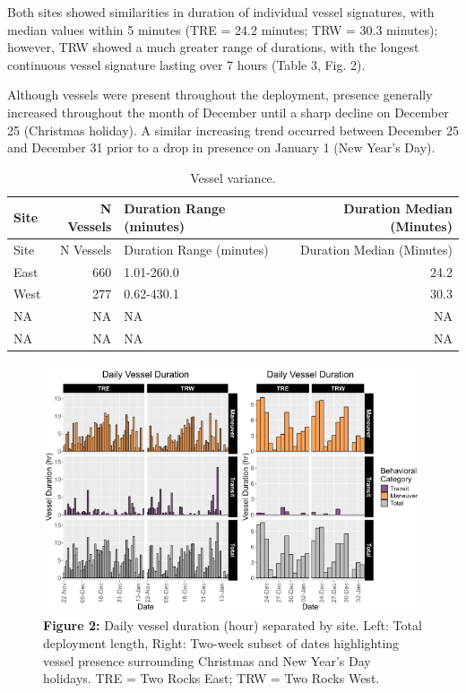 \documentclass[
  letterpaper,
  oneside,
  open=any]{scrbook}
\begin{document}
Both sites showed similarities in duration of individual vessel
signatures, with median values within 5 minutes (TRE = 24.2 minutes; TRW
= 30.3 minutes); however, TRW showed a much greater range of durations,
with the longest continuous vessel signature lasting over 7 hours (Table
3, Fig. 2).

Although vessels were present throughout the deployment, presence
generally increased throughout the month of December until a sharp
decline on December 25 (Christmas holiday). A similar increasing trend
occurred between December 25 and December 31 prior to a drop in presence
on January 1 (New Year's Day).

\begin{longtable}[]{@{}lrlr@{}}
\caption{Vessel variance.}\tabularnewline
\toprule\noalign{}
Site & N Vessels & Duration Range (minutes) & Duration Median
(Minutes) \\
\midrule\noalign{}
\endfirsthead
\toprule\noalign{}
Site & N Vessels & Duration Range (minutes) & Duration Median
(Minutes) \\
\midrule\noalign{}
\endhead
\bottomrule\noalign{}
\endlastfoot
East & 660 & 1.01-260.0 & 24.2 \\
West & 277 & 0.62-430.1 & 30.3 \\
NA & NA & NA & NA \\
NA & NA & NA & NA \\
\end{longtable}

\begin{figure}[H]

{\centering \includegraphics{images/Figure.2.PNG}

}

\caption{\textbf{Figure 2:} Daily vessel duration (hour) separated by
site. Left: Total deployment length, Right: Two-week subset of dates
highlighting vessel presence surrounding Christmas and New Year's Day
holidays. TRE = Two Rocks East; TRW = Two Rocks West.}

\end{figure}%
\end{document}
